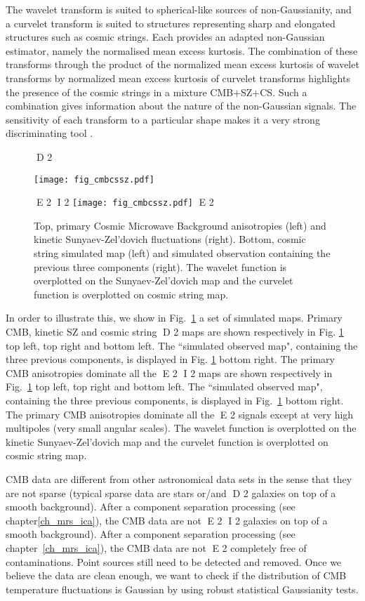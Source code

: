 The wavelet transform is suited to spherical-like sources of non-Gaussianity, and a curvelet transform is suited to structures 
representing sharp and elongated structures such as cosmic strings. Each provides an adapted non-Gaussian estimator, namely 
the normalised mean excess kurtosis. The combination of these transforms through the product of the normalized mean excess kurtosis 
of wavelet transforms by normalized mean excess kurtosis of curvelet transforms highlights the presence of the cosmic strings 
in a mixture CMB+SZ+CS. Such a combination gives information about the nature of the non-Gaussian signals. The sensitivity of 
each transform to a particular shape makes it a very strong discriminating tool \citep{starck:sta03_1,starck:jin05}.

\begin{figure}[htb]
D 2
\centerline{
\vbox{
 \texttt{[image: fig\_cmbcssz.pdf]}
}}
E 2
I 2
\centering
\texttt{[image: fig\_cmbcssz.pdf]}
E 2
\caption{Top, primary Cosmic Microwave Background anisotropies (left) and kinetic Sunyaev-Zel'dovich fluctuations (right). 
Bottom, cosmic string simulated map (left) and simulated observation containing the previous three components (right). 
The wavelet function is overplotted on the Sunyaev-Zel'dovich map and the curvelet function is overplotted on cosmic string map.}
\label{fig_cmb}
\end{figure}

In order to illustrate this, we show in Fig.~\ref{fig_cmb} a set of simulated maps. Primary CMB, kinetic SZ and cosmic string 
D 2
maps are shown respectively in Fig. \ref{fig_cmb} top left, top right and bottom left. The ``simulated observed map", containing 
the three previous components, is displayed in Fig. \ref{fig_cmb} bottom right. The primary CMB anisotropies dominate all the 
E 2
I 2
maps are shown respectively in Fig.~\ref{fig_cmb} top left, top right and bottom left. The ``simulated observed map", containing 
the three previous components, is displayed in Fig.~\ref{fig_cmb} bottom right. The primary CMB anisotropies dominate all the 
E 2
signals except at very high multipoles (very small angular scales). The wavelet function is overplotted on the kinetic Sunyaev-Zel'dovich 
map and the curvelet function is overplotted on cosmic string map.


CMB data are different from other astronomical data sets in the sense that they are not sparse (typical sparse data are stars or/and 
D 2
galaxies on top of a smooth background). After a component separation processing (see chapter\ref{ch_mrs_ica}), the CMB data are not 
E 2
I 2
galaxies on top of a smooth background). After a component separation processing (see chapter~\ref{ch_mrs_ica}), the CMB data are not 
E 2
completely free of contaminations. Point sources still need to be detected and removed. Once we believe the data are clean enough, 
we want to check if the distribution of CMB temperature fluctuations is Gaussian by using robust statistical Gaussianity tests. 

